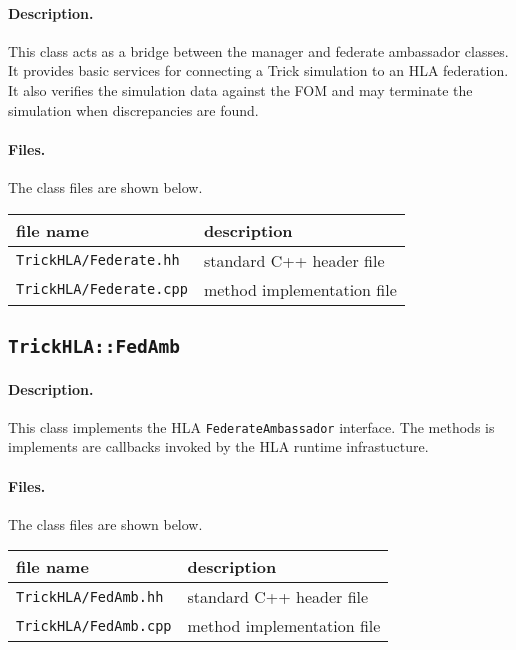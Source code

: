 \paragraph{Description.}
This class acts as a bridge between the manager and federate ambassador
classes.
It provides basic services for connecting a Trick simulation to an
HLA federation.
It also verifies the simulation data against the FOM and may terminate the
simulation when discrepancies are found.

\paragraph{Files.}
The class files are shown below.
   
{
  \scriptsize
  \begin{tabular}{|l|l|} 
    \hline
    file name & description \\
    \hline \hline
    {\tt TrickHLA/Federate.hh} 
    & standard C++ header file
    \\ \hline
    {\tt TrickHLA/Federate.cpp} 
    & method implementation file
    \\ \hline
  \end{tabular}
}

\subsection{{\tt TrickHLA::FedAmb}}

\paragraph{Description.}
This class implements the HLA {\tt FederateAmbassador} interface.
The methods is implements are callbacks invoked by the HLA runtime
infrastucture.

\paragraph{Files.}
The class files are shown below.
   
{
  \scriptsize
  \begin{tabular}{|l|l|} 
    \hline
    file name & description \\
    \hline \hline
    {\tt TrickHLA/FedAmb.hh} 
    & standard C++ header file
    \\ \hline
    {\tt TrickHLA/FedAmb.cpp} 
    & method implementation file
    \\ \hline
  \end{tabular}
}

